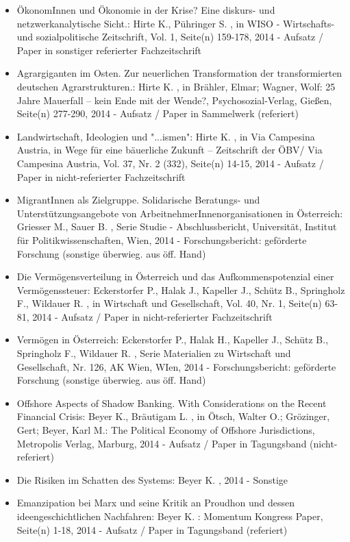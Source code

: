 \begin{itemize}
	 \item ÖkonomInnen und Ökonomie in der Krise? Eine diskurs- und netzwerkanalytische Sicht.: Hirte K., Pühringer S. , in WISO - Wirtschafts- und sozialpolitische Zeitschrift, Vol. 1, Seite(n) 159-178, 2014 - Aufsatz / Paper in sonstiger referierter Fachzeitschrift
	 \item Agrargiganten im Osten. Zur neuerlichen Transformation der transformierten deutschen Agrarstrukturen.: Hirte K. , in Brähler, Elmar; Wagner, Wolf: 25 Jahre Mauerfall – kein Ende mit der Wende?, Psychosozial-Verlag, Gießen, Seite(n) 277-­290, 2014 - Aufsatz / Paper in Sammelwerk (referiert)
	 \item Landwirtschaft, Ideologien und "...ismen": Hirte K. , in Via Campesina Austria, in Wege für eine bäuerliche Zukunft – Zeitschrift der ÖBV/ Via Campesina Austria, Vol. 37, Nr. 2 (332), Seite(n) 14-15, 2014 - Aufsatz / Paper in nicht-referierter Fachzeitschrift
	 \item MigrantInnen als Zielgruppe. Solidarische Beratungs- und Unterstützungsangebote von ArbeitnehmerInnenorganisationen in Österreich: Griesser M., Sauer B. , Serie Studie - Abschlussbericht, Universität, Institut für Politikwissenschaften, Wien, 2014 - Forschungsbericht: geförderte Forschung (sonstige überwieg. aus öff. Hand)
	 \item Die Vermögensverteilung in Österreich und das Aufkommenspotenzial einer Vermögenssteuer: Eckerstorfer P., Halak J., Kapeller J., Schütz B., Springholz F., Wildauer R. , in Wirtschaft und Gesellschaft, Vol. 40, Nr. 1, Seite(n) 63-81, 2014 - Aufsatz / Paper in nicht-referierter Fachzeitschrift
	 \item Vermögen in Österreich: Eckerstorfer P., Halak H., Kapeller J., Schütz B., Springholz F., Wildauer R. , Serie Materialien zu Wirtschaft und Gesellschaft, Nr. 126, AK Wien, WIen, 2014 - Forschungsbericht: geförderte Forschung (sonstige überwieg. aus öff. Hand)
	 \item Offshore Aspects of Shadow Banking. With Considerations on the Recent Financial Crisis: Beyer K., Bräutigam L. , in Ötsch, Walter O.; Grözinger, Gert; Beyer, Karl M.: The Political Economy of Offshore Jurisdictions, Metropolis Verlag, Marburg, 2014 - Aufsatz / Paper in Tagungsband (nicht-referiert)
	 \item Die Risiken im Schatten des Systems: Beyer K. , 2014 - Sonstige
	 \item Emanzipation bei Marx und seine Kritik an Proudhon und dessen ideengeschichtlichen Nachfahren: Beyer K. : Momentum Kongress Paper, Seite(n) 1-18, 2014 - Aufsatz / Paper in Tagungsband (referiert)
\end{itemize} 
